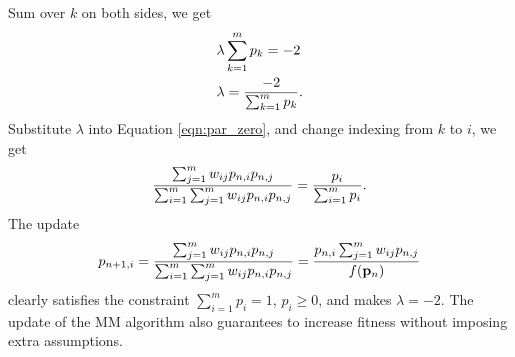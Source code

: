 \documentclass{scrartcl}
\begin{document}
Sum over $k$ on both sides, we get
\begin{align}
	\begin{split}
	& \lambda \sum_{k=1}^m p_k = -2 \\
	& \lambda = {-2 \over \sum_{k=1}^m p_k} .
	\end{split}
\end{align}
Substitute $\lambda$ into Equation \eqref{eqn:par_zero}, 
and change indexing from $k$ to $i$, we get
\begin{equation}
	\frac{\sum_{j=1}^m w_{ij}p_{n,i}p_{n,j}}
	     {\sum_{i=1}^m\sum_{j=1}^m w_{ij}p_{n,i}p_{n,j}}
	= {p_i \over \sum_{i=1}^m p_i} .
\end{equation}
The update
\begin{equation}
	p_{n+1,i} = \frac{\sum_{j=1}^m w_{ij}p_{n,i}p_{n,j}}
	     {\sum_{i=1}^m\sum_{j=1}^m w_{ij}p_{n,i}p_{n,j}}
	    = \frac{p_{n,i}\sum_{j=1}^m w_{ij}p_{n,j}}
	     {f(\mathbf{p}_n)}
\end{equation}
clearly satisfies the constraint $\sum_{i=1}^m p_i = 1$,
$p_i \ge 0$, and makes $\lambda = -2$.
The update of the MM algorithm also guarantees to increase fitness without
imposing extra assumptions.

\end{document}
